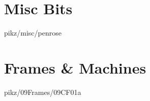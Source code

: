 \documentclass[9pt,xcolor={svgnames, x11names}]{beamer}
\begin{document}


%   


\section{Misc Bits}


\begin{frame}{pikz/misc/penrose}
  
\end{frame}


\section{Frames \& Machines}


\begin{frame}{pikz/09Frames/09CF01a}
  
\end{frame}

\end{document}
